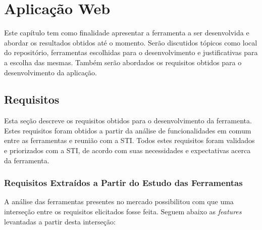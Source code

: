 \chapter[Aplicação Web]{Aplicação Web}

Este capítulo tem como finalidade apresentar a ferramenta a ser desenvolvida e abordar os resultados obtidos até o momento. Serão discutidos tópicos como local do repositório, ferramentas escolhidas para o desenvolvimento e justificativas para a escolha das mesmas. Também serão abordados os requisitos obtidos para o desenvolvimento da aplicação.

\section{Requisitos}

Esta seção descreve os requisitos obtidos para o desenvolvimento da ferramenta. Estes requisitos foram obtidos a partir da análise de funcionalidades em comum entre as ferramentas e reunião com a STI. Todos estes requisitos foram validados e priorizados com a STI, de acordo com suas necessidades e expectativas acerca da ferramenta.

\subsection{Requisitos Extraídos a Partir do Estudo das Ferramentas}

A análise das ferramentas presentes no mercado possibilitou com que uma interseção entre os requisitos elicitados fosse feita. Seguem abaixo as \textit{features} levantadas a partir desta interseção:

